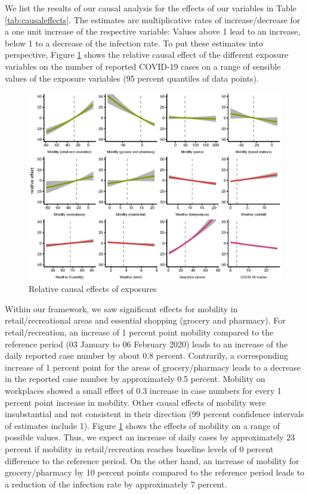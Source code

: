 \documentclass[]{elsarticle} %
\makeatletter
\def\maxwidth{\ifdim\Gin@nat@width>\linewidth\linewidth
\else\Gin@nat@width\fi}
\let\Oldincludegraphics\includegraphics
\renewcommand{\includegraphics}[1]{\Oldincludegraphics[width=\maxwidth]{#1}}
\makeatother
\begin{document}
We list the results of our causal analysis for the effects of our variables in Table \ref{tab:causaleffects}. The estimates are multiplicative rates of increase/decrease for a one unit increase of the respective variable: Values above 1 lead to an increase, below 1 to a decrease of the infection rate. To put these estimates into perspective, Figure \ref{fig:effectsrange} shows the relative causal effect of the different exposure variables on the number of reported COVID-19 cases on a range of sensible values of the exposure variables (95 percent quantiles of data points).

\begin{figure}
\centering
\includegraphics{figures/f_exposure_vs_effect.eps}
\caption{\label{fig:effectsrange}Relative causal effects of exposures}
\end{figure}

Within our framework, we saw significant effects for mobility in retail/recreational areas and essential shopping (grocery and pharmacy). For retail/recreation, an increase of 1 percent point mobility compared to the reference period (03 January to 06 February 2020) leads to an increase of the daily reported case number by about 0.8 percent. Contrarily, a corresponding increase of 1 percent point for the areas of grocery/pharmacy leads to a decrease in the reported case number by approximately 0.5 percent. Mobility on workplaces showed a small effect of 0.3 increase in case numbers for every 1 percent point increase in mobility. Other causal effects of mobility were insubstantial and not consistent in their direction (99 percent confidence intervals of estimates include 1). Figure \ref{fig:effectsrange} shows the effects of mobility on a range of possible values. Thus, we expect an increase of daily cases by approximately 23 percent if mobility in retail/recreation reaches baseline levels of 0 percent difference to the reference period. On the other hand, an increase of mobility for grocery/pharmacy by 10 percent points compared to the reference period leads to a reduction of the infection rate by approximately 7 percent.
\end{document}
